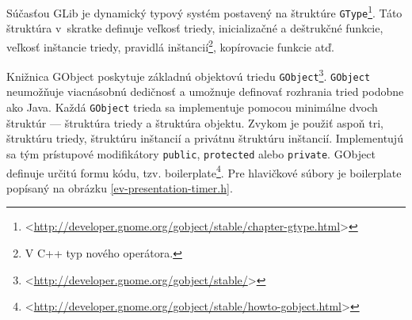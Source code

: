 \documentclass[12pt,oneside,final]{fithesis2}
\begin{document}
Súčasťou GLib je dynamický typový systém postavený na štruktúre 	\texttt{GType}\footnote{<\url{http://developer.gnome.org/gobject/stable/chapter-gtype.html}>}. Táto štruktúra v~skratke definuje veľkosť triedy, inicializačné a deštrukčné funkcie, veľkosť inštancie triedy, pravidlá inštancií\footnote{V C++ typ nového operátora.}, kopírovacie funkcie atď.

Knižnica GObject poskytuje základnú objektovú triedu \texttt{GObject}\footnote{<\url{http://developer.gnome.org/gobject/stable/}>}. \texttt{GObject} neumožňuje viacnásobnú dedičnosť a umožnuje definovať rozhrania tried podobne ako Java. Každá \texttt{GObject} trieda sa implementuje pomocou minimálne dvoch štruktúr --- štruktúra triedy a štruktúra objektu. Zvykom je použiť aspoň tri, štruktúru triedy, štruktúru inštancií a privátnu štruktúru inštancií. Implementujú sa tým prístupové modifikátory \texttt{public}, \texttt{protected} alebo \texttt{private}. GObject definuje určitú formu kódu, tzv. boilerplate\footnote{<\url{http://developer.gnome.org/gobject/stable/howto-gobject.html}>}.
Pre hlavičkové súbory je boilerplate popísaný na obrázku \ref{ev-presentation-timer.h}.
\end{document}
